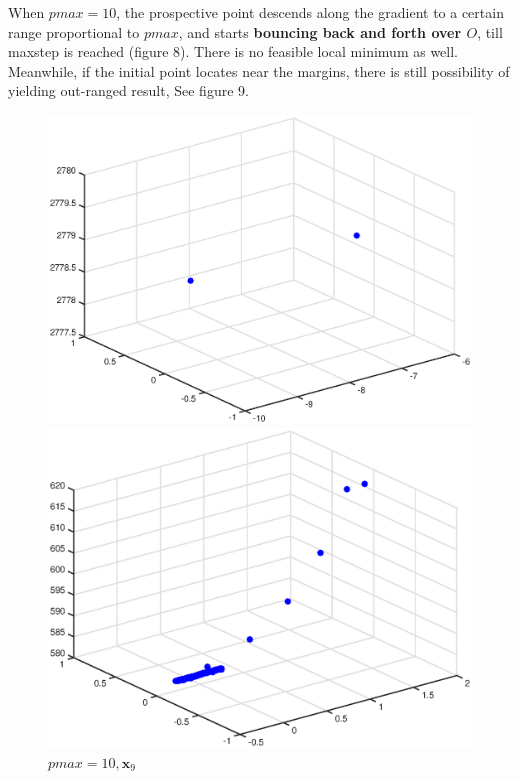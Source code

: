 \documentclass{article}
\begin{document}
When $pmax = 10$, the prospective point descends along the gradient to a certain range proportional to $pmax$, and starts \textbf{bouncing back and forth over $O$}, till maxstep is reached (figure 8). There is no feasible local minimum as well. Meanwhile, if the initial point locates near the margins, there is still possibility of yielding out-ranged result, See figure 9.
\begin{figure}[h]
\begin{minipage}[t]{0.5\linewidth}
\centering
\includegraphics[scale=0.4]{25}
\caption{$pmax=10,\mathbf{x}_8$}
\end{minipage}%
\begin{minipage}[t]{0.5\linewidth}
\centering
\includegraphics[scale=0.4]{27}
\caption{$pmax=10,\mathbf{x}_9$}
\end{minipage}
\end{figure}
\end{document}
